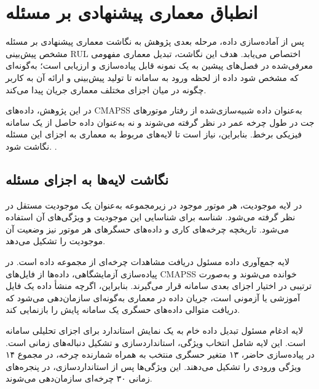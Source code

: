 


\section{انطباق معماری پیشنهادی بر مسئله }
\label{sec:arch-cmapss}

پس از آماده‌سازی داده، مرحله بعدی پژوهش به نگاشت معماری پیشنهادی
بر مسئله مشخص پیش‌بینی \gls{RUL} اختصاص می‌یابد. هدف این نگاشت،
تبدیل معماری مفهومی معرفی‌شده در فصل‌های پیشین به یک نمونه قابل
پیاده‌سازی و ارزیابی است؛ به‌گونه‌ای که مشخص شود داده از لحظه ورود
به سامانه تا تولید پیش‌بینی و ارائه آن به کاربر چگونه در میان
اجزای مختلف معماری جریان پیدا می‌کند.

در این پژوهش، داده‌های \gls{CMAPSS} به‌عنوان داده شبیه‌سازی‌شده
از رفتار موتورهای جت در طول چرخه عمر در نظر گرفته می‌شوند و نه
به‌عنوان داده حاصل از یک سامانه فیزیکی برخط. بنابراین، نیاز است تا لایه‌های مربوط به معماری به اجزای این مسئله نگاشت شود. \cite{qi2021enabling,tao2018digital}.

\subsection{نگاشت لایه‌ها به اجزای مسئله}
\label{sec:layer-mapping}

در لایه موجودیت، هر موتور موجود در زیرمجموعه  به‌عنوان
یک موجودیت مستقل در نظر گرفته می‌شود. شناسه 
برای شناسایی این موجودیت و ویژگی‌های آن استفاده
می‌شود. تاریخچه چرخه‌های کاری و داده‌های حسگرهای هر موتور نیز وضعیت آن موجودیت را تشکیل می‌دهد.

لایه جمع‌آوری داده مسئول دریافت مشاهدات چرخه‌ای از مجموعه داده
است. در پیاده‌سازی آزمایشگاهی، داده‌ها از فایل‌های
\gls{CMAPSS} خوانده می‌شوند و به‌صورت ترتیبی در اختیار اجزای
بعدی سامانه قرار می‌گیرند. بنابراین، اگرچه منشأ داده یک فایل
آموزشی یا آزمونی است، جریان داده در معماری به‌گونه‌ای سازمان‌دهی
می‌شود که دریافت متوالی داده‌های حسگری یک سامانه پایش را بازنمایی
کند.


لایه ادغام مسئول تبدیل داده خام به یک نمایش استاندارد برای
اجزای تحلیلی سامانه است. این لایه شامل انتخاب ویژگی،
استانداردسازی و تشکیل دنباله‌های زمانی است. در پیاده‌سازی
حاضر، ۱۳ متغیر حسگری منتخب به همراه شمارنده چرخه، در مجموع ۱۴ ویژگی ورودی را تشکیل می‌دهند.
این ویژگی‌ها پس از استانداردسازی، در پنجره‌های زمانی
۳۰ چرخه‌ای سازمان‌دهی می‌شوند.


